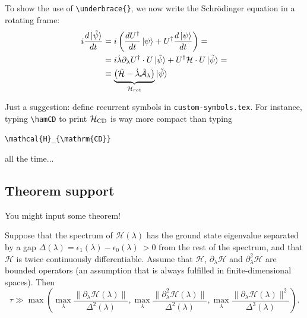 To show the use of \texttt{\textbackslash underbrace\{\}}, we now write the Schrödinger equation in a rotating frame:
\begin{align}
    i\frac{d\ket{\tilde{\psi}}}{dt} &= i\left( \frac{dU^\dag}{dt}\ket{\psi} + U^\dag \frac{d\ket{\psi}}{dt} \right) = \nonumber\\
    &= i\dot\lambda \partial_\lambda U^\dag \cdot U\ket{\tilde{\psi}} + U^\dag\mathcal{H}\cdot U\ket{\tilde{\psi}} =\nonumber\\
    & \equiv \underbrace{\left( \tilde{\mathcal{H}} - \dot\lambda \tilde{\mathcal{A}}_\lambda \right)}_{\mathcal{H}_{rot}}\ket{\tilde{\psi}} \label{eq:schr-movingframe}
\end{align}

Just a suggestion: define recurrent symbols in \texttt{custom-symbols.tex}. For instance, typing \texttt{\textbackslash hamCD} to print $\mathcal{H}_{\mathrm{CD}}$ is way more compact than typing
\begin{center}
    \texttt{\textbackslash mathcal\{H\}\_\{\textbackslash mathrm\{CD\}\}}
\end{center}
all the time...





\subsection{Theorem support}

You might input some theorem!

\begin{theorem}
Suppose that the spectrum of $\mathcal{H}(\lambda)$ has the ground state eigenvalue separated by a gap $\Delta(\lambda)=\epsilon_1(\lambda)-\epsilon_0(\lambda)\ >0$ from the rest of the spectrum, and that $\mathcal{H}$ is twice continuously differentiable. Assume that $\mathcal{H}$, $\partial_\lambda\mathcal{H}$ and $\partial^2_\lambda\mathcal{H}$ are bounded operators (an assumption that is always fulfilled in finite-dimensional spaces). Then
\begin{equation}
    \tau \gg \max\left(
        \max_\lambda \frac{\|\partial_\lambda\mathcal{H}(\lambda)\|}{\Delta^2(\lambda)},
        \max_\lambda \frac{\|\partial^2_\lambda\mathcal{H}(\lambda)\|}{\Delta^2(\lambda)}, 
        \max_\lambda \frac{\|\partial_\lambda\mathcal{H}(\lambda)\|^2}{\Delta^3(\lambda)}
    \right) .
\end{equation}
\end{theorem}








